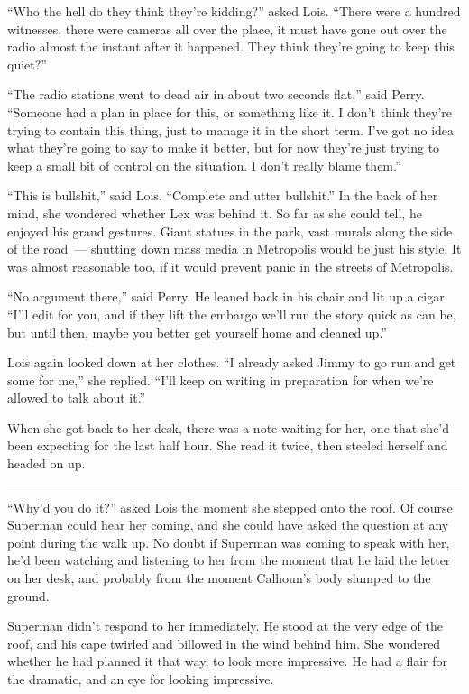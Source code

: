 \documentclass[ebook,12pt]{memoir}
\begin{document}
``Who the hell do they think they're kidding?'' asked Lois. ``There were
a hundred witnesses, there were cameras all over the place, it must have
gone out over the radio almost the instant after it happened. They think
they're going to keep this quiet?''

``The radio stations went to dead air in about two seconds flat,'' said
Perry. ``Someone had a plan in place for this, or something like it. I
don't think they're trying to contain this thing, just to manage it in
the short term. I've got no idea what they're going to say to make it
better, but for now they're just trying to keep a small bit of control
on the situation. I don't really blame them.''

``This is bullshit,'' said Lois. ``Complete and utter bullshit.'' In the
back of her mind, she wondered whether Lex was behind it. So far as she
could tell, he enjoyed his grand gestures. Giant statues in the park,
vast murals along the side of the road~--- shutting down mass media in
Metropolis would be just his style. It was almost reasonable too, if it
would prevent panic in the streets of Metropolis.

``No argument there,'' said Perry. He leaned back in his chair and lit
up a cigar. ``I'll edit for you, and if they lift the embargo we'll run
the story quick as can be, but until then, maybe you better get yourself
home and cleaned up.''

Lois again looked down at her clothes. ``I already asked Jimmy to go run
and get some for me,'' she replied. ``I'll keep on writing in
preparation for when we're allowed to talk about it.''

When she got back to her desk, there was a note waiting for her, one
that she'd been expecting for the last half hour. She read it twice,
then steeled herself and headed on up.

\begin{center}\rule{0.5\linewidth}{\linethickness}\end{center}

``Why'd you do it?'' asked Lois the moment she stepped onto the roof. Of
course Superman could hear her coming, and she could have asked the
question at any point during the walk up. No doubt if Superman was
coming to speak with her, he'd been watching and listening to her from
the moment that he laid the letter on her desk, and probably from the
moment Calhoun's body slumped to the ground.

Superman didn't respond to her immediately. He stood at the very edge of
the roof, and his cape twirled and billowed in the wind behind him. She
wondered whether he had planned it that way, to look more impressive. He
had a flair for the dramatic, and an eye for looking impressive.
\end{document}
